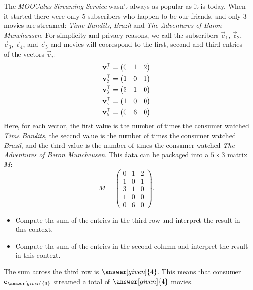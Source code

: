\documentclass{ximera}
\begin{document}
\begin{example}
  The \textit{MOOCulus Streaming Service} wasn't always as popular as
  it is today. When it started there were only $5$ subscribers who
  happen to be our friends, and only $3$ movies are streamed:
  \textit{Time Bandits}, \textit{Brazil} and \textit{The Adventures of Baron
    Munchausen}. For simplicity and privacy reasons, we call the
  subscribers $\vec c_1$, $\vec c_2$, $\vec c_3$, $\vec c_4$, and
  $\vec c_5$ and movies will coorespond to the first, second and third
  entries of the vectors $\vec v_i$:
  \begin{align*}
    \mathbf{v}_{1}^\top &= \begin{pmatrix}0 & 1 & 2\end{pmatrix}\\
    \mathbf{v}_{2}^\top &= \begin{pmatrix}1 & 0 & 1\end{pmatrix}\\
    \mathbf{v}_{3}^\top &= \begin{pmatrix}3 & 1 & 0\end{pmatrix}\\
    \mathbf{v}_{4}^\top &= \begin{pmatrix}1 & 0 & 0\end{pmatrix}\\
    \mathbf{v}_{5}^\top &= \begin{pmatrix}0 & 6 & 0\end{pmatrix}
  \end{align*}
  Here, for each vector, the first value is the number of times the
  consumer watched \textit{Time Bandits}, the second value is the
  number of times the consumer watched \textit{Brazil}, and the third
  value is the number of times the consumer watched \textit{The
    Adventures of Baron Munchausen}.  This data can be packaged into a
  $5 \times 3$ matrix $M$:
  \[
    M =
    \begin{pmatrix}
      0 & 1 & 2\\
      1 & 0 & 1\\
      3 & 1 & 0\\
      1 & 0 & 0\\
      0 & 6 & 0
    \end{pmatrix}.
  \]
  \begin{itemize}
  \item Compute the sum of the entries in the third row and interpret the result in this context.
  \item Compute the sum of the entries in the second column and interpret the result in this context.
  \end{itemize}
  \begin{explanation}
    The sum across the third row is $\answer[given]{4}$. This means
    that consumer $\vec{c}_{\answer[given]{3}}$ streamed a total of  $\answer[given]{4}$  movies.



\end{explanation}
\end{example}
\end{document}
